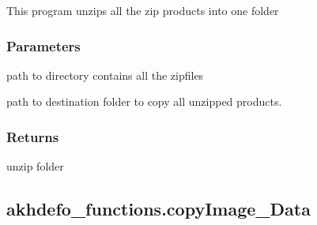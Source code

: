 \documentclass[letterpaper,10pt]{sphinxmanual}
\begin{document}
\begin{fulllineitems}
\label{\detokenize{generated/akhdefo_functions.unzip:akhdefo_functions.unzip}}
\pysigstartsignatures
{}
\pysigstopsignatures
\sphinxAtStartPar
This program unzips all the zip products into one folder


\subsubsection{Parameters}
\label{\detokenize{generated/akhdefo_functions.unzip:parameters}}\begin{description}
\sphinxAtStartPar
path to directory contains all the zipfiles

\sphinxAtStartPar
path to destination folder to copy all unzipped products.

\end{description}


\subsubsection{Returns}
\label{\detokenize{generated/akhdefo_functions.unzip:returns}}
\sphinxAtStartPar
unzip folder

\end{fulllineitems}


\sphinxstepscope


\subsection{akhdefo\_functions.copyImage\_Data}
\label{\detokenize{generated/akhdefo_functions.copyImage_Data:akhdefo-functions-copyimage-data}}\label{\detokenize{generated/akhdefo_functions.copyImage_Data::doc}}
\end{document}
